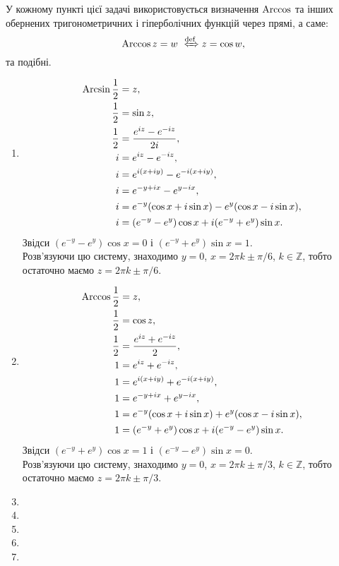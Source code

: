 \begin{solution}
	У кожному пункті цієї задачі використовується визначення $\operatorname{Arccos}$ та інших обернених тригонометричних і гіперболічних функцій через прямі, а саме:
	\begin{equation}
		\label{eq:1.4.2}
		\Arccos z = w \xLeftrightarrow{\text{def}} z = \cos w,
	\end{equation}
	та подібні.
	\begin{enumerate}
		\item \begin{align*}
			\operatorname{Arcsin} \frac 12 &= z, \\
			\frac 12 &= \sin z, \\
			\frac 12 &= \frac{e^{iz}-e^{-iz}}{2i}, \\
			i &= e^{iz}-e^{-iz}, \\
			i &= e^{i(x+iy)}-e^{-i(x+iy)}, \\
			i &= e^{-y+ix}-e^{y-ix}, \\
			i &= e^{-y} (\cos x + i \sin x) - e^y (\cos x - i \sin x), \\
			i &= (e^{-y} - e^y) \cos x + i (e^{-y} + e^y) \sin x.
		\end{align*}
		Звідси $(e^{-y} - e^y) \cos x = 0$ і $(e^{-y} + e^y) \sin x = 1$. \\

		Розв'язуючи цю систему, знаходимо $y = 0$, $x = 2 \pi k \pm \pi / 6$, $k\in\mathbb{Z}$, тобто остаточно маємо $z = 2 \pi k \pm \pi / 6$.
		\item \begin{align*}
			\operatorname{Arccos} \frac 12 &= z, \\
			\frac 12 &= \cos z, \\
			\frac 12 &= \frac{e^{iz}+e^{-iz}}{2}, \\
			1 &= e^{iz}+e^{-iz}, \\
			1 &= e^{i(x+iy)}+e^{-i(x+iy)}, \\
			1 &= e^{-y+ix}+e^{y-ix}, \\
			1 &= e^{-y} (\cos x + i \sin x) + e^y (\cos x - i \sin x), \\
			1 &= (e^{-y} + e^y) \cos x + i (e^{-y} - e^y) \sin x.
		\end{align*}
		Звідси $(e^{-y} + e^y) \cos x = 1$ і $(e^{-y} - e^y) \sin x = 0$. \\

		Розв'язуючи цю систему, знаходимо $y = 0$, $x = 2 \pi k \pm \pi / 3$, $k\in\mathbb{Z}$, тобто остаточно маємо $z = 2 \pi k \pm \pi / 3$.
		\item 
		\item 
		\item 
		\item 
		\item 
	\end{enumerate}
\end{solution}

